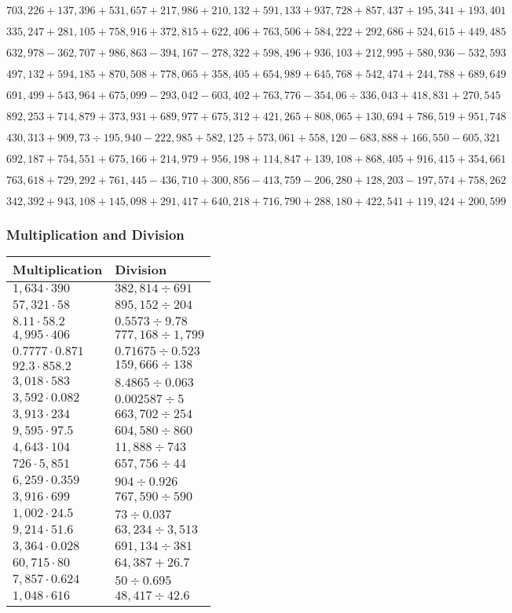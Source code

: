 \(703,226+137,396+531,657+217,986+210,132+591,133+937,728+857,437+195,341+ 193,401\)

\(335,247+281,105+758,916+372,815+622,406+763,506+584,222+292,686+524,615+449,485\)

\(632,978-362,707+986,863-394,167-278,322+598,496+936,103+212,995+580,936-532,593\)

\(497,132+594,185+870,508+778,065+358,405+654,989+645,768+542,474+244,788+689,649\)

\(691,499+543,964+675,099-293,042-603,402+763,776-354,06÷336,043+418,831+270,545\)

\(892,253+714,879+373,931+689,977+675,312+421,265+808,065+130,694+786,519+951,748\)

\(430,313+909,73÷195,940-222,985+582,125+573,061+558,120-683,888+166,550-605,321\)

\(692,187+754,551+675,166+214,979+956,198+114,847+139,108+868,405+916,415+354,661\)

\(763,618+729,292+761,445-436,710+300,856-413,759-206,280+128,203-197,574+758,262\)

\(342,392+943,108+145,098+291,417+640,218+716,790+288,180+422,541+119,424+200,599\)

\hypertarget{multiplication-and-division-318}{%
\subsubsection{Multiplication and
Division}\label{multiplication-and-division-318}}

\begin{longtable}[]{@{}ll@{}}
\toprule
Multiplication & Division\tabularnewline
\midrule
\endhead
\(1,634\cdot390\) & \(382,814÷691\)\tabularnewline
\(57,321\cdot58\) & \(895,152÷204\)\tabularnewline
\(8.11\cdot58.2\) & \(0.5573÷9.78\)\tabularnewline
\(4,995\cdot406\) & \(777,168÷1,799\)\tabularnewline
\(0.7777\cdot0.871\) & \(0.71675÷0.523\)\tabularnewline
\(92.3\cdot858.2\) & \(159,666÷138\)\tabularnewline
\(3,018\cdot583\) & \(8.4865÷0.063\)\tabularnewline
\(3,592\cdot0.082\) & \(0.002587÷5\)\tabularnewline
\(3,913\cdot234\) & \(663,702÷254\)\tabularnewline
\(9,595\cdot97.5\) & \(604,580÷860\)\tabularnewline
\(4,643\cdot104\) & \(11,888÷743\)\tabularnewline
\(726\cdot5,851\) & \(657,756÷44\)\tabularnewline
\(6,259\cdot0.359\) & \(904÷0.926\)\tabularnewline
\(3,916\cdot699\) & \(767,590÷590\)\tabularnewline
\(1,002\cdot24.5\) & \(73÷0.037\)\tabularnewline
\(9,214\cdot51.6\) & \(63,234÷3,513\)\tabularnewline
\(3,364\cdot0.028\) & \(691,134÷381\)\tabularnewline
\(60,715\cdot80\) & \(64,387 + 26.7\)\tabularnewline
\(7,857\cdot0.624\) & \(50÷0.695\)\tabularnewline
\(1,048\cdot616\) & \(48,417÷42.6\)\tabularnewline
\bottomrule
\end{longtable}

